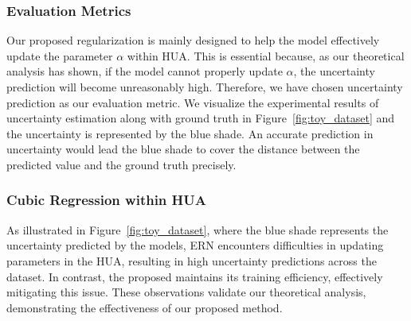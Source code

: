 \subsubsection{Evaluation Metrics}
Our proposed regularization is mainly designed to help the model effectively update the parameter $\alpha$ within HUA. This is essential because, as our theoretical analysis has shown, if the model cannot properly update $\alpha$, the uncertainty prediction will become unreasonably high. Therefore, we have chosen uncertainty prediction as our evaluation metric. We visualize the experimental results of uncertainty estimation along with ground truth in Figure~\ref{fig:toy_dataset} and the uncertainty is represented by the blue shade. An accurate prediction in uncertainty would lead the blue shade to cover the distance between the predicted value and the ground truth precisely.

\subsubsection{Cubic Regression within HUA}
As illustrated in Figure~\ref{fig:toy_dataset}, where the blue shade represents the uncertainty predicted by the models, ERN encounters difficulties in updating parameters in the HUA, resulting in high uncertainty predictions across the dataset. In contrast, the proposed \ours maintains its training efficiency, effectively mitigating this issue. These observations validate our theoretical analysis, demonstrating the effectiveness of our proposed method. 
